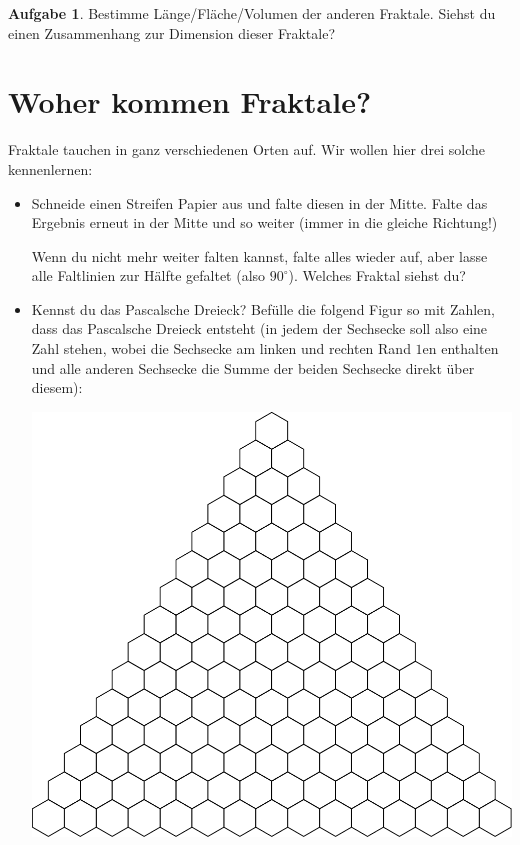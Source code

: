 \documentclass[a4paper,ngerman,12pt]{scrartcl}
\theoremstyle{definition}
\newtheorem{aufg}{Aufgabe}
\theoremstyle{plain}
\theoremstyle{remark}
\begin{document}
\begin{aufg}
	Bestimme Länge/Fläche/Volumen der anderen Fraktale. Siehst du einen Zusammenhang zur Dimension dieser Fraktale?
\end{aufg}


\section{Woher kommen Fraktale?}

Fraktale tauchen in ganz verschiedenen Orten auf. Wir wollen hier drei solche kennenlernen:

\begin{itemize}
	\item Schneide einen Streifen Papier aus und falte diesen in der Mitte. Falte das Ergebnis erneut in der Mitte und so weiter (immer in die gleiche Richtung!)

	Wenn du nicht mehr weiter falten kannst, falte alles wieder auf, aber lasse alle Faltlinien zur Hälfte gefaltet (also $90^\circ$). Welches Fraktal siehst du?
	
	\item Kennst du das Pascalsche Dreieck? Befülle die folgend Figur so mit Zahlen, dass das Pascalsche Dreieck entsteht (in jedem der Sechsecke soll also eine Zahl stehen, wobei die Sechsecke am linken und rechten Rand $1$en enthalten und alle anderen Sechsecke die Summe der beiden Sechsecke direkt über diesem):
		
		\begin{center}
				\includegraphics[width=.9\textwidth]{Bilder/Pascalsches-Dreieck.pdf}
		\end{center}
	

\end{itemize}
\end{document}
